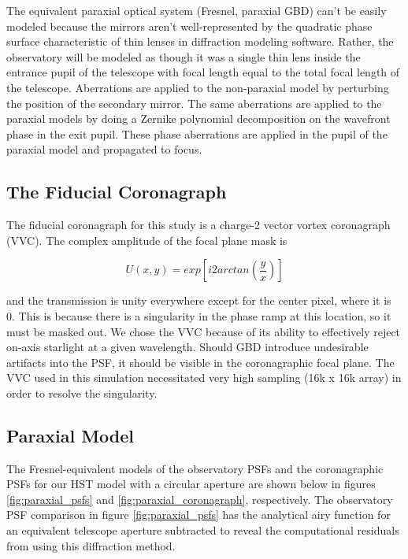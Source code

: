 The equivalent paraxial optical system (Fresnel, paraxial GBD) can't be easily modeled because the mirrors aren't well-represented by the quadratic phase surface characteristic of thin lenses in diffraction modeling software. Rather, the observatory will be modeled as though it was a single thin lens inside the entrance pupil of the telescope with focal length equal to the total focal length of the telescope. Aberrations are applied to the non-paraxial model by perturbing the position of the secondary mirror. The same aberrations are applied to the paraxial models by doing a Zernike polynomial decomposition on the wavefront phase in the exit pupil. These phase aberrations are applied in the pupil of the paraxial model and propagated to focus.

\subsection{The Fiducial Coronagraph}

The fiducial coronagraph for this study is a charge-2 vector vortex coronagraph (VVC). The complex amplitude of the focal plane mask is 

\begin{equation}
	U(x,y) = exp[i 2 arctan(\frac{y}{x})]
\end{equation}

and the transmission is unity everywhere except for the center pixel, where it is 0. This is because there is a singularity in the phase ramp at this location, so it must be masked out. We chose the VVC because of its ability to effectively reject on-axis starlight at a given wavelength. Should GBD introduce undesirable artifacts into the PSF, it should be visible in the coronagraphic focal plane. The VVC used in this simulation necessitated very high sampling (16k x 16k array) in order to resolve the singularity.

\label{sect:results}  %
\subsection{Paraxial Model}

The Fresnel-equivalent models of the observatory PSFs and the coronagraphic PSFs for our HST model with a circular aperture are shown below in figures \ref{fig:paraxial_psfs} and \ref{fig:paraxial_coronagraph}, respectively. The observatory PSF comparison in figure \ref{fig:paraxial_psfs} has the analytical airy function for an equivalent telescope aperture subtracted to reveal the computational residuals from using this diffraction method.


